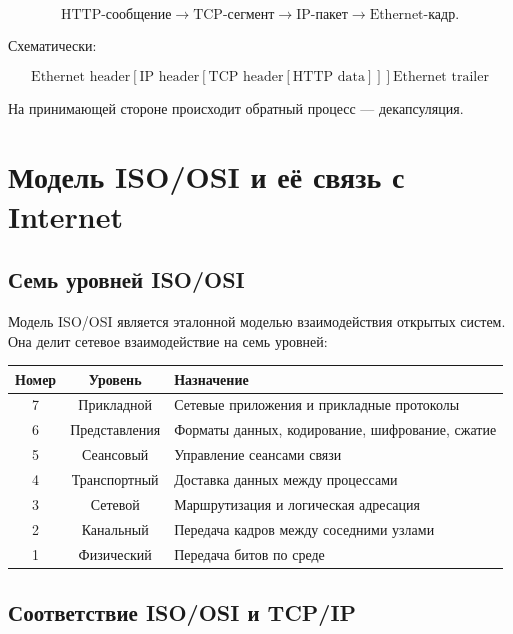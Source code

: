 \documentclass[12pt,a4paper]{article}
\begin{document}
\[
\text{HTTP-сообщение}
\rightarrow
\text{TCP-сегмент}
\rightarrow
\text{IP-пакет}
\rightarrow
\text{Ethernet-кадр}.
\]

Схематически:

\[
\boxed{
\text{Ethernet header}
\left[
    \text{IP header}
    \left[
        \text{TCP header}
        \left[
            \text{HTTP data}
        \right]
    \right]
\right]
\text{Ethernet trailer}
}
\]

На принимающей стороне происходит обратный процесс --- декапсуляция.

\section{Модель ISO/OSI и её связь с Internet}

\subsection{Семь уровней ISO/OSI}

Модель ISO/OSI является эталонной моделью взаимодействия открытых систем. Она делит сетевое взаимодействие на семь уровней:

\begin{center}
\begin{tabular}{|c|c|p{8cm}|}
\hline
\textbf{Номер} & \textbf{Уровень} & \textbf{Назначение} \\
\hline
7 & Прикладной & Сетевые приложения и прикладные протоколы \\
\hline
6 & Представления & Форматы данных, кодирование, шифрование, сжатие \\
\hline
5 & Сеансовый & Управление сеансами связи \\
\hline
4 & Транспортный & Доставка данных между процессами \\
\hline
3 & Сетевой & Маршрутизация и логическая адресация \\
\hline
2 & Канальный & Передача кадров между соседними узлами \\
\hline
1 & Физический & Передача битов по среде \\
\hline
\end{tabular}
\end{center}

\subsection{Соответствие ISO/OSI и TCP/IP}
\end{document}
